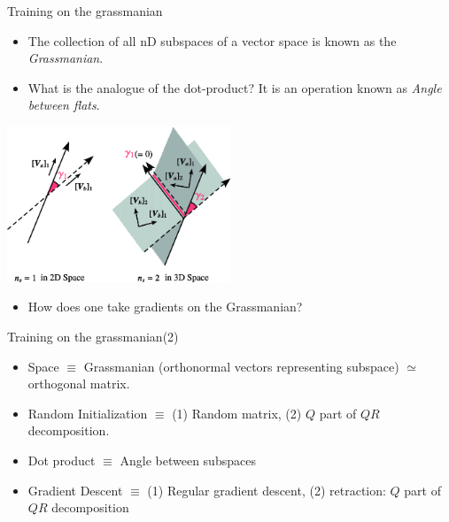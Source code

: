 \documentclass[8pt]{beamer}
\begin{document}
\begin{frame}{Training on the grassmanian}
  \begin{itemize}
    \item The collection of all nD subspaces of a vector space is known as the \emph{Grassmanian}. \pause
    \item What is the analogue of the dot-product? It is an operation known as \emph{Angle between flats}.
  \end{itemize}
  \includegraphics[width=0.5\textwidth]{./angles-between-flats.png}
  \begin{itemize}
    \item How does one take gradients on the Grassmanian?
  \end{itemize}
\end{frame}

\begin{frame}{Training on the grassmanian(2)}
  \begin{itemize}
    \item Space $\equiv$ Grassmanian (orthonormal vectors representing subspace) $\simeq$ orthogonal matrix.
    \item Random Initialization $\equiv$ (1) Random matrix, (2) $Q$ part of $QR$ decomposition.
    \item Dot product $\equiv$ Angle between subspaces
    \item Gradient Descent $\equiv$ (1) Regular gradient descent, (2) retraction: $Q$ part of $QR$ decomposition 
  \end{itemize}
\end{frame}
\end{document}
